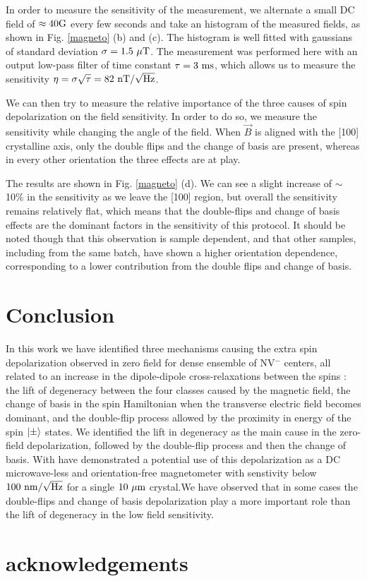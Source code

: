 \documentclass[preprintnumbers,amsmath,amssymb,superscriptaddress,twocolumn,showpacs]{revtex4-2}
\begin{document}
In order to measure the sensitivity of the measurement, we alternate a small DC field of $\approx 40 \rm G$ every few seconds and take an histogram of the measured fields, as shown in Fig. \ref{magneto} (b) and (c). The histogram is well fitted with gaussians of standard deviation $\sigma=1.5\ \mu \rm T$. The measurement was performed here with an output low-pass filter of time constant $\tau=3\ \rm ms$, which allows us to measure the sensitivity $\eta=\sigma \sqrt{\tau}=82\ \rm{nT}/\sqrt{\rm Hz}$.

We can then try to measure the relative importance of the three causes of spin depolarization on the field sensitivity. In order to do so, we measure the sensitivity while changing the angle of the field. When $\vec B$ is aligned with the [100] crystalline axis, only the double flips and the change of basis are present, whereas in every other orientation the three effects are at play.

The results are shown in Fig. \ref{magneto} (d). We can see a slight increase of $\sim$ 10\% in the sensitivity as we leave the [100] region, but overall the sensitivity remains relatively flat, which means that the double-flips and change of basis effects are the dominant factors in the sensitivity of this protocol. %
It should be noted though that this observation is sample dependent, and that other samples, including from the same batch, have shown a higher orientation dependence, corresponding to a lower contribution from the double flips and change of basis.

\section*{Conclusion}
In this work we have identified three mechanisms causing the extra spin depolarization observed in zero field for dense ensemble of NV$^-$ centers, all related to an increase in the dipole-dipole cross-relaxations between the spins : the lift of degeneracy between the four classes caused by the magnetic field, the change of basis in the spin Hamiltonian when the transverse electric field becomes dominant, and the double-flip process allowed by the proximity in energy of the spin $\ket{\pm}$ states. We identified the lift in degeneracy as the main cause in the zero-field depolarization, followed by the double-flip process and then the change of basis. With have demonstrated a potential use of this depolarization as a DC microwave-less and orientation-free magnetometer with senstivity below $100\ \rm{nm}/\sqrt{\rm Hz}$ for a single $10\ \mu \rm m$ crystal.We have observed that in some cases the double-flips and change of basis depolarization play a more important role than the lift of degeneracy in the low field sensitivity.
\section*{acknowledgements}


{}
\end{document}
